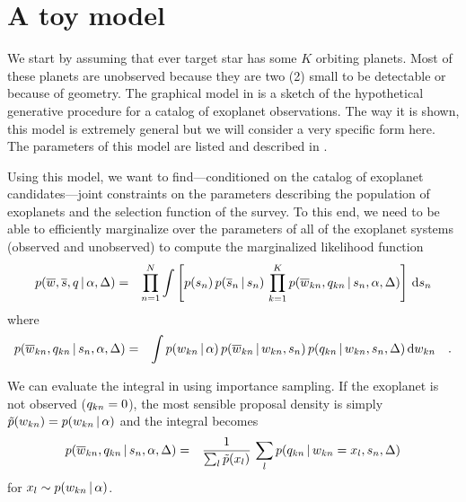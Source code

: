 \documentclass[12pt,preprint]{aastex}
\begin{document}
\section{A toy model}

We start by assuming that ever target star has some $K$ orbiting planets.
Most of these planets are unobserved because they are two (2) small to be
detectable or because of geometry.
The graphical model in  is a sketch of the hypothetical generative
procedure for a catalog of exoplanet observations.
The way it is shown, this model is extremely general but we will consider a
very specific form here.
The parameters of this model are listed and described in .

Using this model, we want to find---conditioned on the catalog of exoplanet
candidates---joint constraints on the parameters describing the population of
exoplanets and the selection function of the survey.
To this end, we need to be able to efficiently marginalize over the parameters
of all of the exoplanet systems (observed and unobserved) to compute the
marginalized likelihood function
\begin{eqnarray}
p(\overline{w},\overline{s},q\,|\,\alpha,\Delta) &=&
\prod_{n=1}^N \int \left [
p(s_n)\,p(\overline{s}_n\,|\,s_n) \,
 \prod_{k=1}^K
p(\overline{w}_{kn},q_{kn}\,|\,s_n,\alpha,\Delta)\right ]
\,\mathrm{d} s_n
\end{eqnarray}
where
\begin{eqnarray}\eqlabel{planet-marg}
p(\planetobs_{kn},\isobs_{kn}\,|\,\stellar_n,\population,\selection) &=&
\int
p(\planet_{kn}\,|\,\population) \,
p(\planetobs_{kn}\,|\,\planet_{kn},\stellar_{n}) \,
p(\isobs_{kn}\,|\,\planet_{kn},\stellar_{n},\selection)
\dd \planet_{kn} \quad.
\end{eqnarray}

We can evaluate the integral in  using importance sampling.
If the exoplanet is not observed ($q_{kn}=0$), the most sensible proposal
density is simply $\tilde{p}(w_{kn})=p(w_{kn}\,|\,\alpha)$
and the integral becomes
\begin{eqnarray}
p(\overline{w}_{kn},q_{kn}\,|\,s_n,\alpha,\Delta) &=&
\frac{1}{\sum_l \tilde{p}(x_l)}\,\sum_l
p(q_{kn}\,|\,w_{kn}=x_l,s_{n},\Delta)
\end{eqnarray}
for $x_l \sim p(w_{kn}\,|\,\alpha)$.
\end{document}
